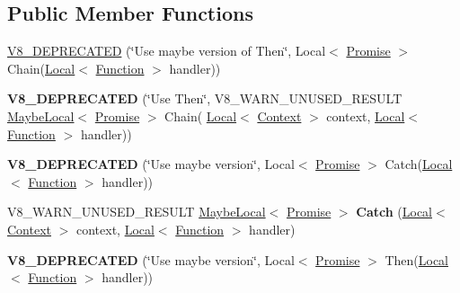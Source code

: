 \subsection*{Public Member Functions}
\begin{DoxyCompactItemize}
\item 
\hyperlink{classv8_1_1_promise_a8378226f7b9e986184742dc5bb3cc78b}{V8\+\_\+\+D\+E\+P\+R\+E\+C\+A\+T\+ED} (\char`\"{}Use maybe version of Then\char`\"{}, Local$<$ \hyperlink{classv8_1_1_promise}{Promise} $>$ Chain(\hyperlink{classv8_1_1_local}{Local}$<$ \hyperlink{classv8_1_1_function}{Function} $>$ handler))
\item 
{\bfseries V8\+\_\+\+D\+E\+P\+R\+E\+C\+A\+T\+ED} (\char`\"{}Use Then\char`\"{}, V8\+\_\+\+W\+A\+R\+N\+\_\+\+U\+N\+U\+S\+E\+D\+\_\+\+R\+E\+S\+U\+LT \hyperlink{classv8_1_1_maybe_local}{Maybe\+Local}$<$ \hyperlink{classv8_1_1_promise}{Promise} $>$ Chain(                                                                       \hyperlink{classv8_1_1_local}{Local}$<$ \hyperlink{classv8_1_1_context}{Context} $>$ context, \hyperlink{classv8_1_1_local}{Local}$<$ \hyperlink{classv8_1_1_function}{Function} $>$ handler))\hypertarget{classv8_1_1_promise_a6a144ca5339ce1ccf856b4c142a9ff3e}{}\label{classv8_1_1_promise_a6a144ca5339ce1ccf856b4c142a9ff3e}

\item 
{\bfseries V8\+\_\+\+D\+E\+P\+R\+E\+C\+A\+T\+ED} (\char`\"{}Use maybe version\char`\"{}, Local$<$ \hyperlink{classv8_1_1_promise}{Promise} $>$ Catch(\hyperlink{classv8_1_1_local}{Local}$<$ \hyperlink{classv8_1_1_function}{Function} $>$ handler))\hypertarget{classv8_1_1_promise_abac3f6124a1393b13500f2579bd28513}{}\label{classv8_1_1_promise_abac3f6124a1393b13500f2579bd28513}

\item 
V8\+\_\+\+W\+A\+R\+N\+\_\+\+U\+N\+U\+S\+E\+D\+\_\+\+R\+E\+S\+U\+LT \hyperlink{classv8_1_1_maybe_local}{Maybe\+Local}$<$ \hyperlink{classv8_1_1_promise}{Promise} $>$ {\bfseries Catch} (\hyperlink{classv8_1_1_local}{Local}$<$ \hyperlink{classv8_1_1_context}{Context} $>$ context, \hyperlink{classv8_1_1_local}{Local}$<$ \hyperlink{classv8_1_1_function}{Function} $>$ handler)\hypertarget{classv8_1_1_promise_a91e2ed2e68832a9490d8f93e928df690}{}\label{classv8_1_1_promise_a91e2ed2e68832a9490d8f93e928df690}

\item 
{\bfseries V8\+\_\+\+D\+E\+P\+R\+E\+C\+A\+T\+ED} (\char`\"{}Use maybe version\char`\"{}, Local$<$ \hyperlink{classv8_1_1_promise}{Promise} $>$ Then(\hyperlink{classv8_1_1_local}{Local}$<$ \hyperlink{classv8_1_1_function}{Function} $>$ handler))\hypertarget{classv8_1_1_promise_a9bb6f0ee5815b09a9ad25b1f263a471c}{}\label{classv8_1_1_promise_a9bb6f0ee5815b09a9ad25b1f263a471c}


\end{DoxyCompactItemize}
